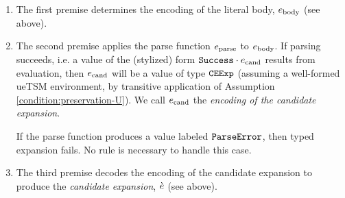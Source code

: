 \begin{enumerate}
\item The first premise determines the encoding of the literal body, $e_\text{body}$ (see above).
\item The second premise applies the parse function $e_\text{parse}$ to $e_\text{body}$. If parsing succeeds, i.e. a value of the (stylized) form $\mathtt{Success} \cdot e_\text{cand}$ results from evaluation, then $e_\text{cand}$ will be a value of type $\mathtt{CEExp}$ (assuming a well-formed ueTSM environment, by transitive application of Assumption \ref{condition:preservation-U}). We call $e_\text{cand}$ the \emph{encoding of the candidate expansion}.

If the parse function produces a value labeled $\mathtt{ParseError}$, then typed expansion fails. No rule is necessary to handle this case. 

\item The third premise decodes the encoding of the candidate expansion to produce the \emph{candidate expansion}, $\grave{e}$ (see above).


\end{enumerate}
